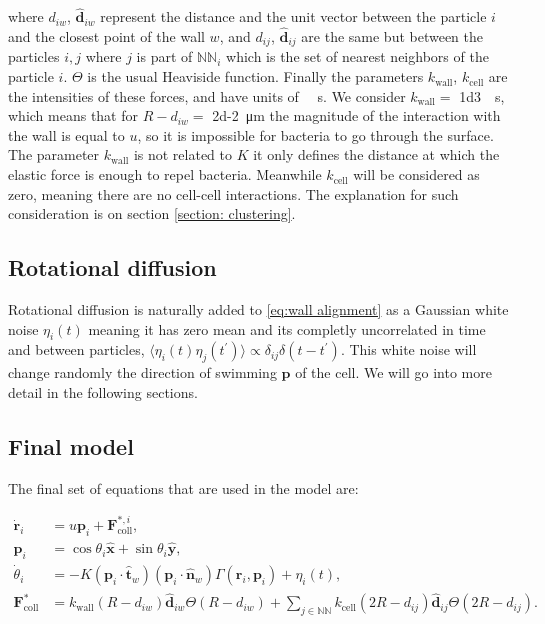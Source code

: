 where $d_{iw}$, $\hat{\textbf{d}}_{iw}$ represent the distance and the unit vector between the particle $i$ and the closest point of the wall $w$, and $d_{ij}$, $\hat{\textbf{d}}_{ij}$ are the same but between the particles $i,j$ where $j$ is part of $\mathbb{NN}_i$ which is the set of nearest neighbors of the particle $i$. $\Theta$ is the usual Heaviside function. Finally the parameters $k_{\text{wall}}$, $k_{\text{cell}}$ are the intensities of these forces, and have units of \SI[]{}{\per\second}. We consider $k_{\text{wall}}=$ \SI[]{1d3}{\per\second}, which means that for $R-d_{iw}=$ \SI{2d-2}{\micro\meter} the magnitude of the interaction with the wall is equal to $u$, so it is impossible for bacteria to go through the surface. The parameter $k_{\text{wall}}$ is not related to $K$ it only defines the distance at which the elastic force is enough to repel bacteria. Meanwhile $k_{\text{cell}}$ will be considered as zero, meaning there are no cell-cell interactions. The explanation for such consideration is on section \ref{section: clustering}.

\subsection{Rotational diffusion}

 Rotational diffusion is naturally added to \eqref{eq:wall alignment} as a Gaussian white noise $\eta_i(t)$ \cite{Digregorio2018FullSeparation,Caporusso2020Motility-InducedSystem} meaning it has zero mean and its completly uncorrelated in time and between particles, $\langle \eta_i(t)\eta_j(t^\prime)  \rangle \propto \delta_{ij}\delta (t-t^\prime)$. This white noise will change randomly the direction of swimming $\textbf{p}$ of the cell. We will go into more detail in the following sections.
 
\subsection{Final model}

The final set of equations that are used in the model are:

\begin{align}
    \label{eq:dynamics of position}
    \dot{\textbf{r}}_i &= u\textbf{p}_i + \textbf{F}^{*,i}_{\text{coll}}, \\
    \textbf{p}_i &= \cos{\theta_i}\hat{\textbf{x}}+\sin{\theta_i}\hat{\textbf{y}}, \\
    \label{eq:dynamics of angle}
    \dot{\theta}_i &= -K (\textbf{p}_i \cdot \hat{\textbf{t}}_w)  (\textbf{p}_i \cdot \hat{\textbf{n}}_w) \Gamma(\textbf{r}_i, \textbf{p}_i) + \eta_i(t), \\
    \label{eq:elastic force}
    \textbf{F}^*_{\text{coll}} &=   k_{\text{wall}} (R-d_{iw}) \hat{\textbf{d}}_{iw}\Theta(R-d_{iw}) + \sum_{j \in \mathbb{NN}} k_{\text{cell}} (2R-d_{ij}) \hat{\textbf{d}}_{ij}\Theta(2R-d_{ij}).
\end{align}

